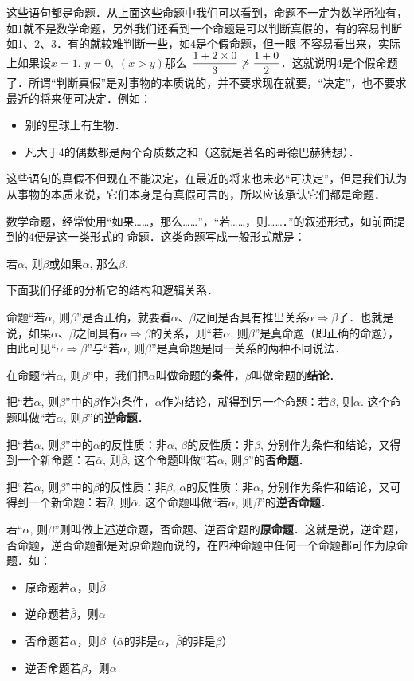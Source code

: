 这些语句都是命题．从上面这些命题中我们可以看到，命题不一定为数学所独有，如1就不是数学命题，另外我们还看到一个命题是可以判断真假的，有的容易判断如1、2、3．有的就较难判断一些，如4是个假命题，但一眼
不容易看出来，实际上如果设$x=1$, $y=0,\;(x>y)$那么
$\dfrac{1+2\times 0}{3}\not>\dfrac{1+0}{2}$．这就说明4是个假命题了．所谓“判断真假”是对事物的本质说的，并不要求现在就要，“决定”，也不要求最近的将来便可决定．例如：
\begin{itemize}
	\item 别的星球上有生物．
	\item 凡大于4的偶数都是两个奇质数之和（这就是著名的哥德巴赫猜想）．
\end{itemize}

这些语句的真假不但现在不能决定，在最近的将来也未必“可决定”，但是我们认为从事物的本质来说，它们本身是有真假可言的，所以应该承认它们都是命题．

数学命题，经常使用“如果……，那么……”，“若……，则……．”的叙述形式，如前面提到的4便是这一类形式的
命题．这类命题写成一般形式就是：
\begin{blk}{}
	若$\alpha$, 则$\beta$\qquad 或\qquad  如果$\alpha$, 那么$\beta$.
\end{blk}

下面我们仔细的分析它的结构和逻辑关系．

命题“若$\alpha$, 则$\beta$”是否正确，就要看$\alpha$、$\beta$之间是否具有推出关系$\alpha\Rightarrow\beta$了．也就是说，如果$\alpha$、$\beta$之间具有$\alpha\Rightarrow\beta$的关系，则“若$\alpha$, 则$\beta$”是真命题（即正确的命题），由此可见“$\alpha\Rightarrow\beta$”与“若$\alpha$, 则$\beta$”是真命题是同一关系的两种不同说法．

在命题“若$\alpha$, 则$\beta$”中，我们把$\alpha$叫做命题的\textbf{条件}，$\beta$叫做命题的\textbf{结论}．

把“若$\alpha$, 则$\beta$”中的$\beta$作为条件，$\alpha$作为结论，就得到另一个命题：若$\beta$, 则$\alpha$. 这个命题叫做“若$\alpha$, 则$\beta$”的\textbf{逆命题}．

把“若$\alpha$, 则$\beta$”中的$\alpha$的反性质：非$\alpha$, $\beta$的反性质：非$\beta$, 分别作为条件和结论，又得到一个新命题：若$\bar\alpha$, 则$\bar\beta$, 这个命题叫做“若$\alpha$, 则$\beta$”的\textbf{否命题}．

把“若$\alpha$, 则$\beta$”中的$\beta$的反性质：非$\beta$, $\alpha$的反性质：非$\alpha$, 分别作为条件和结论，又可得到一个新命题：若$\bar\beta$, 则$\bar\alpha$. 这个命题叫做“若$\alpha$, 则$\beta$”的\textbf{逆否命题}．

若“$\alpha$, 则$\beta$”则叫做上述逆命题，否命题、逆否命题的\textbf{原命题}．这就是说，逆命题，否命题，逆否命题都是对原命题而说的，在四种命题中任何一个命题都可作为原命题．如：
\begin{itemize}
	\item 原命题\quad 若$\bar\alpha$，则$\bar\beta$
	\item 逆命题\quad 若$\bar\beta$，则$\alpha$
	\item 否命题\quad 若$\alpha$，则$\beta$（$\bar\alpha$的非是$\alpha$，$\bar\beta$的非是$\beta$）
	\item 逆否命题\quad 若$\beta$，则$\alpha$
\end{itemize}

